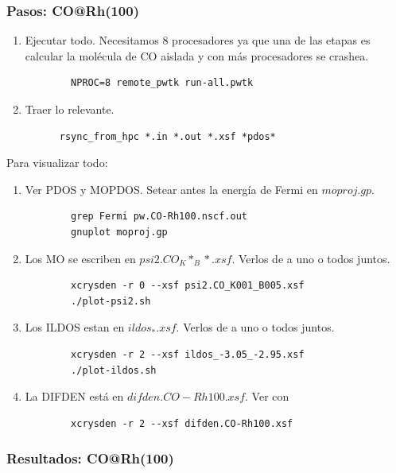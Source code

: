 \subsubsection{Pasos: CO@Rh(100)}

  \begin{enumerate}
    \item Ejecutar todo. Necesitamos 8 procesadores ya que una de las etapas es calcular la molécula de CO aislada y con más procesadores se crashea.
      \begin{verbatim}
        NPROC=8 remote_pwtk run-all.pwtk
      \end{verbatim}
    \item Traer lo relevante.
    \begin{verbatim}
      rsync_from_hpc *.in *.out *.xsf *pdos*
    \end{verbatim}
  \end{enumerate}

  Para visualizar todo:
    \begin{enumerate}
      \item Ver PDOS y MOPDOS. Setear antes la energía de Fermi en $moproj.gp$.
      \begin{verbatim}
        grep Fermi pw.CO-Rh100.nscf.out
        gnuplot moproj.gp
      \end{verbatim}
      \item Los MO se escriben en $psi2.CO_K*_B*.xsf$. Verlos de a uno o todos juntos.
      \begin{verbatim}
        xcrysden -r 0 --xsf psi2.CO_K001_B005.xsf
        ./plot-psi2.sh
      \end{verbatim}
      \item Los ILDOS estan en $ildos_*.xsf$. Verlos de a uno o todos juntos.
      \begin{verbatim}
        xcrysden -r 2 --xsf ildos_-3.05_-2.95.xsf
        ./plot-ildos.sh
      \end{verbatim}
      \item La DIFDEN está en $difden.CO-Rh100.xsf$. Ver con
      \begin{verbatim}
        xcrysden -r 2 --xsf difden.CO-Rh100.xsf
      \end{verbatim}
    \end{enumerate}

\subsubsection{Resultados: CO@Rh(100)}

